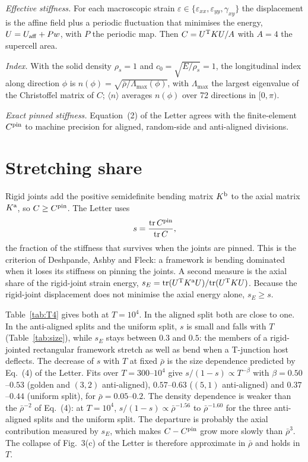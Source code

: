 \documentclass[aps,prl,onecolumn,superscriptaddress,amsmath,amssymb,floatfix]{revtex4-2}
\begin{document}
\textit{Effective stiffness.} For each macroscopic strain $\varepsilon\in\{\varepsilon_{xx},
\varepsilon_{yy},\gamma_{xy}\}$ the displacement is the affine field plus a periodic
fluctuation that minimises the energy, $U=U_{\rm aff}+Pw$, with $P$ the periodic map. Then
$C=U^{\rm T}KU/A$ with $A=4$ the supercell area.

\textit{Index.} With the solid density $\rho_s=1$ and $c_0=\sqrt{E/\rho_s}=1$, the
longitudinal index along direction $\phi$ is $n(\phi)=\sqrt{\bar\rho/\Lambda_{\max}(\phi)}$,
with $\Lambda_{\max}$ the largest eigenvalue of the Christoffel matrix of $C$;
$\langle n\rangle$ averages $n(\phi)$ over 72 directions in $[0,\pi)$.

\textit{Exact pinned stiffness.} Equation~(2) of the Letter agrees with the finite-element
$C^{\rm pin}$ to machine precision for aligned, random-side and anti-aligned divisions.

\section{Stretching share}

Rigid joints add the positive semidefinite bending matrix $K^{\rm b}$ to the axial matrix
$K^{\rm a}$, so $C\ge C^{\rm pin}$. The Letter uses
\begin{equation}
s=\frac{\mathrm{tr}\,C^{\rm pin}}{\mathrm{tr}\,C},
\end{equation}
the fraction of the stiffness that survives when the joints are pinned. This is the
criterion of Deshpande, Ashby and Fleck: a framework is bending dominated when it loses its
stiffness on pinning the joints. A second measure is the axial share of the rigid-joint strain
energy, $s_E=\mathrm{tr}(U^{\rm T}K^{\rm a}U)/\mathrm{tr}(U^{\rm T}KU)$. Because the rigid-joint
displacement does not minimise the axial energy alone, $s_E\ge s$.

Table~\ref{tab:T4} gives both at $T=10^{4}$. In the aligned split both are close to one. In
the anti-aligned splits and the uniform split, $s$ is small and falls with $T$
(Table~\ref{tab:size}), while $s_E$ stays between $0.3$ and $0.5$: the members of a
rigid-jointed rectangular framework stretch as well as bend when a T-junction host deflects.
The decrease of $s$ with $T$ at fixed $\bar\rho$ is the size dependence predicted by Eq.~(4)
of the Letter. Fits over $T=300$--$10^{4}$ give $s/(1-s)\propto T^{-\beta}$ with
$\beta=0.50$--$0.53$ (golden and $(3,2)$ anti-aligned), $0.57$--$0.63$ ($(5,1)$ anti-aligned)
and $0.37$--$0.44$ (uniform split), for $\bar\rho=0.05$--$0.2$. The density dependence is
weaker than the $\bar\rho^{-2}$ of Eq.~(4): at $T=10^{4}$, $s/(1-s)\propto\bar\rho^{-1.56}$ to
$\bar\rho^{-1.60}$ for the three anti-aligned splits and the uniform split. The departure is
probably the axial contribution measured by $s_E$, which makes $C-C^{\rm pin}$ grow more slowly
than $\bar\rho^{3}$. The collapse of Fig.~3(c) of the Letter is therefore approximate in
$\bar\rho$ and holds in $T$.
\end{document}
